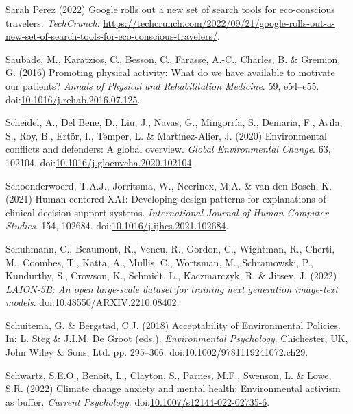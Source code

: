 \documentclass[
  letterpaper,
  DIV=11,
  numbers=noendperiod]{scrartcl}
\newlength{\cslhangindent}
\newenvironment{CSLReferences}[2] %
 {\begin{list}{}{%
  \setlength{\itemindent}{0pt}
  \setlength{\leftmargin}{0pt}
  \setlength{\parsep}{0pt}
  \ifodd #1
   \setlength{\leftmargin}{\cslhangindent}
   \setlength{\itemindent}{-1\cslhangindent}
  \fi
  \setlength{\itemsep}{#2\baselineskip}}}
 {\end{list}}
\begin{document}
\begin{CSLReferences}{0}{1}
Sarah Perez (2022) Google rolls out a new set of search tools for
eco-conscious travelers. \emph{TechCrunch}.
\url{https://techcrunch.com/2022/09/21/google-rolls-out-a-new-set-of-search-tools-for-eco-conscious-travelers/}.

Saubade, M., Karatzios, C., Besson, C., Farasse, A.-C., Charles, B. \&
Gremion, G. (2016) Promoting physical activity: {What} do we have
available to motivate our patients? \emph{Annals of Physical and
Rehabilitation Medicine}. 59, e54--e55.
doi:\href{https://doi.org/10.1016/j.rehab.2016.07.125}{10.1016/j.rehab.2016.07.125}.

Scheidel, A., Del Bene, D., Liu, J., Navas, G., Mingorría, S., Demaria,
F., Avila, S., Roy, B., Ertör, I., Temper, L. \& Martínez-Alier, J.
(2020) Environmental conflicts and defenders: {A} global overview.
\emph{Global Environmental Change}. 63, 102104.
doi:\href{https://doi.org/10.1016/j.gloenvcha.2020.102104}{10.1016/j.gloenvcha.2020.102104}.

Schoonderwoerd, T.A.J., Jorritsma, W., Neerincx, M.A. \& van den Bosch,
K. (2021) Human-centered {XAI}: {Developing} design patterns for
explanations of clinical decision support systems. \emph{International
Journal of Human-Computer Studies}. 154, 102684.
doi:\href{https://doi.org/10.1016/j.ijhcs.2021.102684}{10.1016/j.ijhcs.2021.102684}.

Schuhmann, C., Beaumont, R., Vencu, R., Gordon, C., Wightman, R.,
Cherti, M., Coombes, T., Katta, A., Mullis, C., Wortsman, M.,
Schramowski, P., Kundurthy, S., Crowson, K., Schmidt, L., Kaczmarczyk,
R. \& Jitsev, J. (2022) \emph{{LAION-5B}: {An} open large-scale dataset
for training next generation image-text models}.
doi:\href{https://doi.org/10.48550/ARXIV.2210.08402}{10.48550/ARXIV.2210.08402}.

Schuitema, G. \& Bergstad, C.J. (2018) Acceptability of {Environmental
Policies}. In: L. Steg \& J.I.M. De Groot (eds.). \emph{Environmental
{Psychology}}. Chichester, UK, John Wiley \& Sons, Ltd. pp. 295--306.
doi:\href{https://doi.org/10.1002/9781119241072.ch29}{10.1002/9781119241072.ch29}.

Schwartz, S.E.O., Benoit, L., Clayton, S., Parnes, M.F., Swenson, L. \&
Lowe, S.R. (2022) Climate change anxiety and mental health:
{Environmental} activism as buffer. \emph{Current Psychology}.
doi:\href{https://doi.org/10.1007/s12144-022-02735-6}{10.1007/s12144-022-02735-6}.


\end{CSLReferences}
\end{document}
